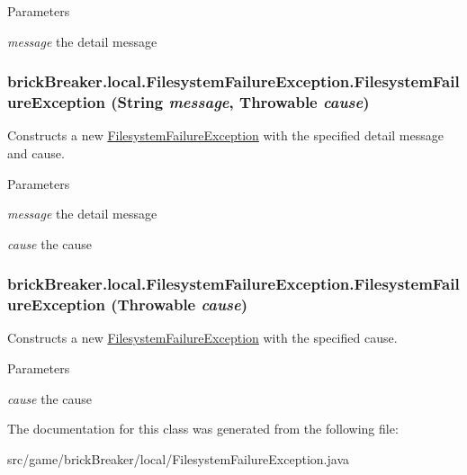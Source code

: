 \begin{DoxyParams}{Parameters}
\item[{\em message}]the detail message \end{DoxyParams}
\hypertarget{classbrick_breaker_1_1local_1_1_filesystem_failure_exception_adac73a32ed79f64fddf90293d68506ad}{
\subsubsection[{FilesystemFailureException}]{\setlength{\rightskip}{0pt plus 5cm}brickBreaker.local.FilesystemFailureException.FilesystemFailureException (String {\em message}, \/  Throwable {\em cause})}}
\label{classbrick_breaker_1_1local_1_1_filesystem_failure_exception_adac73a32ed79f64fddf90293d68506ad}
Constructs a new {\ttfamily \hyperlink{classbrick_breaker_1_1local_1_1_filesystem_failure_exception}{FilesystemFailureException}} with the specified detail message and cause.


\begin{DoxyParams}{Parameters}
\item[{\em message}]the detail message \item[{\em cause}]the cause \end{DoxyParams}
\hypertarget{classbrick_breaker_1_1local_1_1_filesystem_failure_exception_aa72dd755aa1b25516a2fda4c08eb0551}{
\subsubsection[{FilesystemFailureException}]{\setlength{\rightskip}{0pt plus 5cm}brickBreaker.local.FilesystemFailureException.FilesystemFailureException (Throwable {\em cause})}}
\label{classbrick_breaker_1_1local_1_1_filesystem_failure_exception_aa72dd755aa1b25516a2fda4c08eb0551}
Constructs a new {\ttfamily \hyperlink{classbrick_breaker_1_1local_1_1_filesystem_failure_exception}{FilesystemFailureException}} with the specified cause.


\begin{DoxyParams}{Parameters}
\item[{\em cause}]the cause \end{DoxyParams}


The documentation for this class was generated from the following file:\begin{DoxyCompactItemize}
\item 
src/game/brickBreaker/local/FilesystemFailureException.java\end{DoxyCompactItemize}
